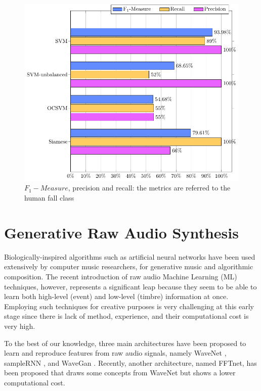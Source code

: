 \begin{figure}[h]
	\centering
	\includegraphics[width=0.65\linewidth]{img/results_f1}
	\caption[Siamese Nets for human-fall detection - Results]{$F_1 -Measure$, precision and recall: the metrics are referred to the human fall class}
	\label{fig:results_f1}
\end{figure}


\newpage

\section{Generative Raw Audio Synthesis}
Biologically-inspired algorithms such as artificial neural networks have been used extensively by computer music researchers, for generative music and algorithmic composition. The recent introduction of raw audio Machine Learning (ML) techniques, however, represents a significant leap because they seem to be able to learn both high-level (event) and low-level (timbre) information at once. Employing such techniques for creative purposes is very challenging at this early stage since there is lack of method, experience, and their computational cost is very high. 

To the best of our knowledge, three main architectures have been proposed to learn and reproduce features from raw audio signals, namely WaveNet \cite{van2016wavenet}, sampleRNN \cite{mehri2016samplernn}, and WaveGan \cite{donahue2018synthesizing}. Recently, another architecture, named FFTnet, has been proposed \cite{jin2018fftnet} that draws some concepts from WaveNet but shows a lower computational cost. 


